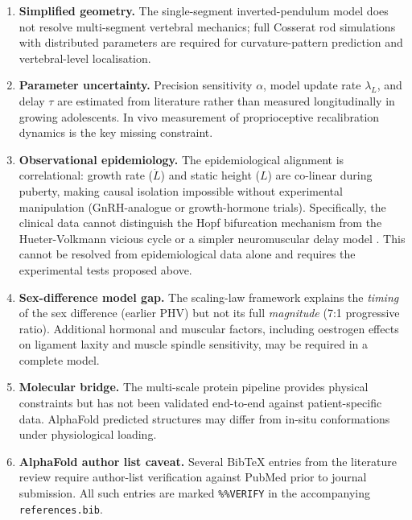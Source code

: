 \documentclass[12pt, letterpaper]{article}
\begin{document}
\begin{enumerate}[label=\arabic*.]
  \item \textbf{Simplified geometry.} The single-segment inverted-pendulum model
    does not resolve multi-segment vertebral mechanics; full Cosserat rod
    simulations with distributed parameters are required for curvature-pattern
    prediction and vertebral-level localisation.

  \item \textbf{Parameter uncertainty.} Precision sensitivity $\alpha$, model
    update rate $\lambda_L$, and delay $\tau$ are estimated from literature
    rather than measured longitudinally in growing adolescents. In vivo
    measurement of proprioceptive recalibration dynamics is the key missing
    constraint.

  \item \textbf{Observational epidemiology.} The epidemiological alignment is
    correlational: growth rate ($\dot{L}$) and static height ($L$) are co-linear
    during puberty, making causal isolation impossible without experimental
    manipulation (GnRH-analogue or growth-hormone trials). Specifically, the
    clinical data cannot distinguish the Hopf bifurcation mechanism from the
    Hueter-Volkmann vicious cycle \citep{Stokes2006} or a simpler neuromuscular
    delay model \citep{Machida1993}. This cannot be resolved from epidemiological
    data alone and requires the experimental tests proposed above.

  \item \textbf{Sex-difference model gap.} The scaling-law framework explains
    the \emph{timing} of the sex difference (earlier PHV) but not its full
    \emph{magnitude} (7:1 progressive ratio). Additional hormonal and muscular
    factors, including oestrogen effects on ligament laxity and muscle spindle
    sensitivity, may be required in a complete model.

  \item \textbf{Molecular bridge.} The multi-scale protein pipeline provides
    physical constraints but has not been validated end-to-end against
    patient-specific data. AlphaFold predicted structures may differ from
    in-situ conformations under physiological loading.

  \item \textbf{AlphaFold author list caveat.} Several BibTeX entries from the
    literature review require author-list verification against PubMed prior to
    journal submission. All such entries are marked \texttt{\%\%VERIFY} in the
    accompanying \texttt{references.bib}.
\end{enumerate}
\end{document}
